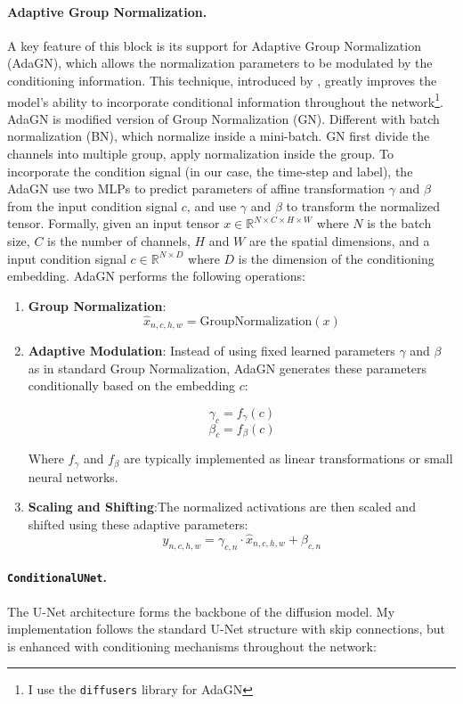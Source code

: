 \documentclass[a4paper,twocolumn]{article}
\begin{document}
\paragraph{Adaptive Group Normalization.} A key feature of this block is its support for Adaptive Group Normalization (AdaGN), which allows the normalization parameters to be modulated by the conditioning information. This technique, introduced by \cite{dhariwal2021diffusion}, greatly improves the 
model's ability to incorporate conditional information throughout the network\footnote{I use the \texttt{diffusers} library for AdaGN}. AdaGN is modified version of Group Normalization (GN). Different with batch normalization (BN), which normalize inside a mini-batch. GN first divide the channels into multiple group, apply normalization inside the group. To incorporate the condition signal (in our case, the time-step and label), the AdaGN use two MLPs to predict parameters of affine transformation $\gamma$ and $\beta$ from the input condition signal $c$, and use $\gamma$ and $\beta$ to transform the normalized tensor. Formally, given an input tensor $x \in \mathbb{R}^{N \times C \times H \times W}$ where $N$ is the batch size, $C$ is the number of channels, $H$ and $W$ are the spatial dimensions, and a input condition signal $c \in \mathbb{R}^{N \times D}$ where $D$ is the dimension of the conditioning embedding. AdaGN performs the following operations:

\begin{enumerate}
\item \textbf{Group Normalization}: 
$$\hat{x}_{n,c,h,w} = \text{GroupNormalization}(x)$$
\item \textbf{Adaptive Modulation}: Instead of using fixed learned parameters $\gamma$ and $\beta$ as in standard Group Normalization, AdaGN generates these parameters conditionally based on the embedding $c$:

$$\gamma_c = f_\gamma(c)$$
$$\beta_c = f_\beta(c)$$

Where $f_\gamma$ and $f_\beta$ are typically implemented as linear transformations or small neural networks.
\item \textbf{Scaling and Shifting}:The normalized activations are then scaled and shifted using these adaptive parameters:
$$y_{n,c,h,w} = \gamma_{c,n} \cdot \hat{x}_{n,c,h,w} + \beta_{c,n}$$
\end{enumerate}




\paragraph{\texttt{ConditionalUNet}.}
The U-Net architecture forms the backbone of the diffusion model. My implementation follows the standard U-Net structure with skip connections, but is enhanced with conditioning mechanisms throughout the network:
\end{document}
